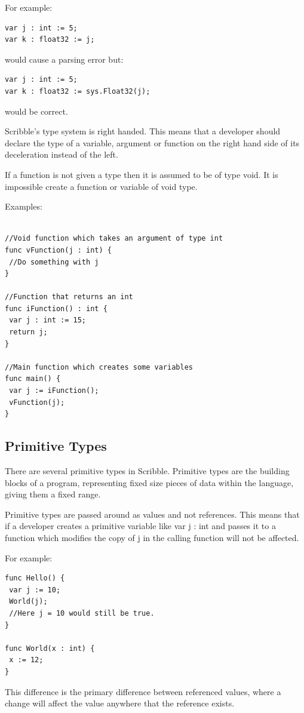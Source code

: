 \documentclass[]{final_report}
\begin{document}
For example:
\begin{verbatim}
var j : int := 5;
var k : float32 := j;
\end{verbatim}
would cause a parsing error but:
\begin{verbatim}
var j : int := 5;
var k : float32 := sys.Float32(j);
\end{verbatim}
would be correct.


Scribble's type system is right handed. This means that a developer should declare the type of a variable, argument or function on the right hand side of its deceleration instead of the left.

If a function is not given a type then it is assumed to be of type void. It is impossible create a function or variable of void type.

Examples:
\begin{verbatim}

//Void function which takes an argument of type int
func vFunction(j : int) {
 //Do something with j
}

//Function that returns an int
func iFunction() : int {
 var j : int := 15;
 return j;
}

//Main function which creates some variables
func main() {
 var j := iFunction();
 vFunction(j);
}
\end{verbatim}

\subsection{Primitive Types}

There are several primitive types in Scribble. Primitive types are the building blocks of a program, representing fixed size pieces of data within the language, giving them a fixed range.

Primitive types are passed around as values and not references. This means that if a developer creates a primitive variable like var j : int and passes it to a function which modifies the copy of j in the calling function will not be affected.

For example: \begin{verbatim}
func Hello() {
 var j := 10;
 World(j);
 //Here j = 10 would still be true.
}

func World(x : int) {
 x := 12;
}
\end{verbatim}

This difference is the primary difference between referenced values, where a change will affect the value anywhere that the reference exists.
\end{document}
